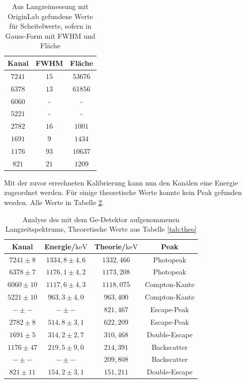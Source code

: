 \documentclass[
	parskip=half,10pt,
	numbers= noenddot, %
	toc=flat, %
	oneside,
	twocolumn,
	]{scrartcl}
\begin{document}
\begin{table}
\centering
\begin{tabular}{ccc}
Kanal & FWHM & Fläche \\
\hline
$7241$ & $15$ & $53676$ \\
$6378$ & $13$ & $61856$ \\
$6060$ & - & - \\
$5221$ & - & - \\
$2782$ & $16$ & $1001$ \\
$1691$ & $9$  & $1434$ \\
$1176$ & $93$ & $10637$ \\
$ 821$ & $21$ & $1209$ 
\end{tabular}
\caption{Aus Langzeimessung mit OriginLab gefundene Werte für Scheitelwerte, sofern in Gauss-Form mit FWHM und Fläche}
\label{tab:fits}
\end{table}

Mit der zuvor errechneten Kalibrierung kann nun den Kanälen eine Energie zugeordnet werden. Für einige theoretische Werte konnte kein Peak gefunden werden. 
Alle Werte in Tabelle \ref{tab:ergebnis}. 

\begin{table}[h]
\centering
\begin{tabular}{cccc}
Kanal & Energie/$\si{\kilo \electronvolt}$ & Theorie/$\si{\kilo \electronvolt}$ & Peak \\
\hline 
$7241 \pm 8$ & $1334,8 \pm 4,6 $ &$1332,466$ &Photopeak \\
$6378 \pm 7$ & $1176,1 \pm 4,2 $ &$1173,208$ &Photopeak\\
$6060 \pm10$ & $1117,6 \pm 4,3 $ &$1118,075$ &Compton-Kante\\
$5221 \pm10$ & $ 963,3 \pm 4,0 $ &$ 963,400$ &Compton-Kante\\
$  -  \pm -$ & $  -    \pm -   $ &$ 821,467$ &Escape-Peak\\
$2782 \pm 8$ & $ 514,8 \pm 3,1 $ &$ 622,209$ &Escape-Peak\\
$1691 \pm 5$ & $ 314,2 \pm 2,7 $ &$ 310,468$ &Double-Escape\\
$1176 \pm47$ & $ 219,5 \pm 9,0 $ &$ 214,391$ &Backscatter\\
$  -  \pm -$ & $  -    \pm -   $ &$ 209,808$ &Backscatter\\
$ 821 \pm11$ & $ 154,2 \pm 3,1 $ &$ 151,211$ &Double-Escape
\end{tabular}
\caption{Analyse des mit dem Ge-Detektor aufgenommenen Langzeitspektrums, Theoretische Werte aus Tabelle \ref{tab:theo}}
\label{tab:ergebnis}
\end{table}
\end{document}
